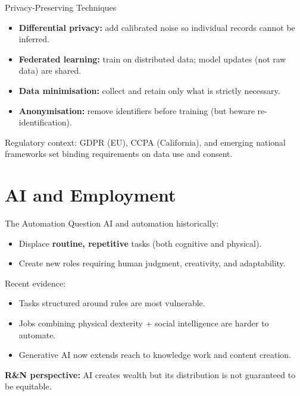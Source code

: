 \documentclass[10pt]{beamer}
\begin{document}
\begin{frame}{Privacy-Preserving Techniques}
    \begin{itemize}
        \item \textbf{Differential privacy:} add calibrated noise so individual records cannot be inferred.
        \item \textbf{Federated learning:} train on distributed data; model updates (not raw data) are shared.
        \item \textbf{Data minimisation:} collect and retain only what is strictly necessary.
        \item \textbf{Anonymisation:} remove identifiers before training (but beware re-identification).
    \end{itemize}

    \vspace{0.2cm}
    Regulatory context: GDPR (EU), CCPA (California), and emerging national frameworks set binding requirements on data use and consent.
\end{frame}

\section{AI and Employment}

\begin{frame}{The Automation Question}
    AI and automation historically:
    \begin{itemize}
        \item Displace \textbf{routine, repetitive} tasks (both cognitive and physical).
        \item Create new roles requiring human judgment, creativity, and adaptability.
    \end{itemize}

    \vspace{0.2cm}
    Recent evidence:
    \begin{itemize}
        \item Tasks structured around rules are most vulnerable.
        \item Jobs combining physical dexterity + social intelligence are harder to automate.
        \item Generative AI now extends reach to knowledge work and content creation.
    \end{itemize}

    \vspace{0.2cm}
    \textbf{R\&N perspective:} AI creates wealth but its distribution is not guaranteed to be equitable.
\end{frame}
\end{document}

